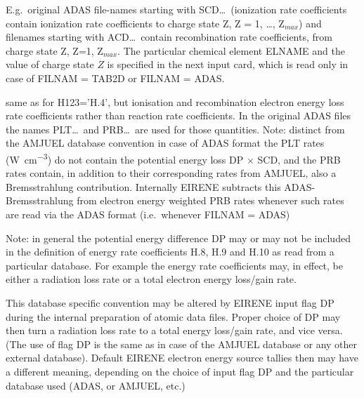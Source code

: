 \begin{description}
\begin{description}
                E.g.\ original \ac{ADAS} file-names starting with SCD\dots\ (ionization rate
                coefficients contain ionization rate coefficients to charge state Z, Z = 1,
                \dots, Z$_{max}$) and filenames starting with  ACD\dots\ contain recombination
                rate coefficients, from charge state Z, Z=1, Z$_{max}$.
                The particular chemical element ELNAME and the value of charge state $Z$ is
                specified in the next input card, which is read only in case of FILNAM = TAB2D
                    or FILNAM = ADAS.
          \item[H.10] same as for H123='H.4', but ionisation and recombination electron
                energy loss rate coefficients rather than reaction rate coefficients.
                In the original \ac{ADAS} files the names PLT\dots\ and PRB\dots\ are used for
                those quantities.
                Note:
                distinct from the AMJUEL database convention in case of
                \ac{ADAS} format the PLT rates (\si{\watt\per\cubic\centi\metre}) do not
                contain the potential energy loss
                DP $\times$ SCD, and the PRB rates contain, in addition to
                their corresponding rates from AMJUEL, also
                a Bremsstrahlung contribution.
                Internally EIRENE subtracts this \acs{ADAS}-Bremsstrahlung from electron energy
                weighted PRB rates whenever such rates are read via the \ac{ADAS} format (i.e.\
                whenever FILNAM = ADAS) 

                Note: in general the potential energy difference DP may or may not be included
                in the definition of energy rate coefficients H.8, H.9 and H.10 as read from a
                particular database.
                For example the energy rate coefficients may, in effect,  be either a radiation
                loss rate or a total electron energy loss/gain rate.

                This database specific convention may be altered by EIRENE input flag DP during
                the internal preparation of atomic data files.
                Proper choice of DP may then turn a radiation loss rate to a total energy
                loss/gain rate, and vice versa.
                (The use of flag DP is the same as in case of the AMJUEL database or any other
                external database).
                Default EIRENE electron energy source tallies then may have a different
                meaning, depending on the choice of input flag DP and the particular database
                used (\ac{ADAS}, or AMJUEL, etc.)
        \end{description}


\end{description}
